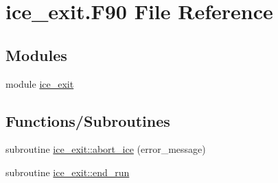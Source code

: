 \hypertarget{ice__exit_8F90}{
\section{ice\_\-exit.F90 File Reference}
\label{ice__exit_8F90}
}
\subsection*{Modules}
\begin{DoxyCompactItemize}
\item 
module \hyperlink{namespaceice__exit}{ice\_\-exit}
\end{DoxyCompactItemize}
\subsection*{Functions/Subroutines}
\begin{DoxyCompactItemize}
\item 
subroutine \hyperlink{namespaceice__exit_a3fcf77109320e75f1268f41fe212d789}{ice\_\-exit::abort\_\-ice} (error\_\-message)
\item 
subroutine \hyperlink{namespaceice__exit_a9f6aab7e1aabcf5c3a8e8843eed1bc44}{ice\_\-exit::end\_\-run}
\end{DoxyCompactItemize}
